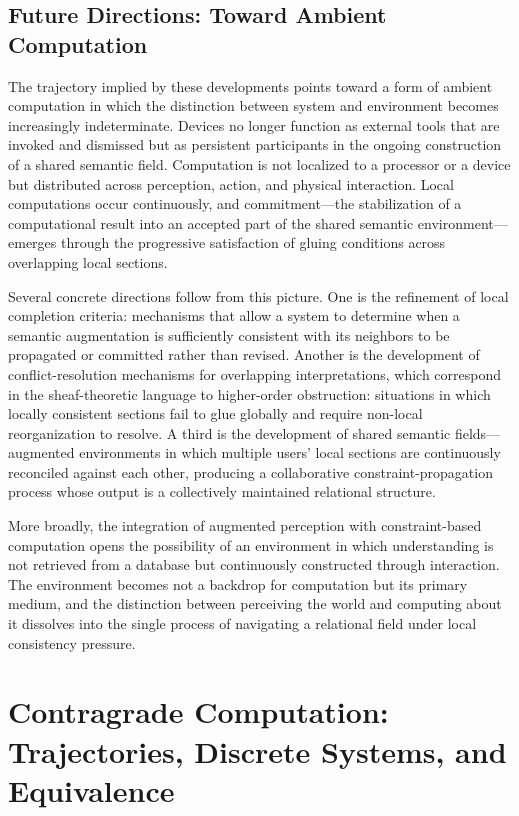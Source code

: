 \documentclass[12pt,a4paper,openany]{book}
\theoremstyle{plain}
\theoremstyle{definition}
\theoremstyle{remark}
\begin{document}
\section{Future Directions: Toward Ambient Computation}

The trajectory implied by these developments points toward a form of ambient computation in which the distinction between system and environment becomes increasingly indeterminate. Devices no longer function as external tools that are invoked and dismissed but as persistent participants in the ongoing construction of a shared semantic field. Computation is not localized to a processor or a device but distributed across perception, action, and physical interaction. Local computations occur continuously, and commitment---the stabilization of a computational result into an accepted part of the shared semantic environment---emerges through the progressive satisfaction of gluing conditions across overlapping local sections.

Several concrete directions follow from this picture. One is the refinement of local completion criteria: mechanisms that allow a system to determine when a semantic augmentation is sufficiently consistent with its neighbors to be propagated or committed rather than revised. Another is the development of conflict-resolution mechanisms for overlapping interpretations, which correspond in the sheaf-theoretic language to higher-order obstruction: situations in which locally consistent sections fail to glue globally and require non-local reorganization to resolve. A third is the development of shared semantic fields---augmented environments in which multiple users' local sections are continuously reconciled against each other, producing a collaborative constraint-propagation process whose output is a collectively maintained relational structure.

More broadly, the integration of augmented perception with constraint-based computation opens the possibility of an environment in which understanding is not retrieved from a database but continuously constructed through interaction. The environment becomes not a backdrop for computation but its primary medium, and the distinction between perceiving the world and computing about it dissolves into the single process of navigating a relational field under local consistency pressure.

\chapter{Contragrade Computation: Trajectories, Discrete Systems, and Equivalence}
\end{document}

